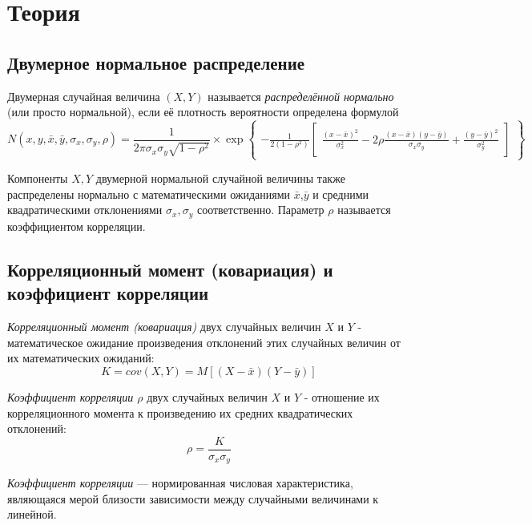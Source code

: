 \documentclass[12pt,a4paper]{article}
\begin{document}
\section{Теория}
\subsection{Двумерное нормальное распределение}
Двумерная случайная величина $(X,Y)$ называется \textit{распределённой нормально} (или просто нормальной), если её плотность вероятности определена формулой
\begin{equation}
    N(x,y,\bar{x},\bar{y},\sigma_x,\sigma_y,\rho)=\frac{1}{2\pi\sigma_x\sigma_y\sqrt{1-\rho^2}}\times\exp{
    \begin{Bmatrix}
        -\frac{1}{2(1-\rho^2)}
        \begin{bmatrix}
            \frac{(x-\bar{x})^2}{\sigma_x^2}-2\rho\frac{(x-\bar{x})(y-\bar{y})}{\sigma_x\sigma_y}+\frac{(y-\bar{y})^2}{\sigma_y^2}
        \end{bmatrix}
    \end{Bmatrix}
    }
\end{equation}

Компоненты $X,Y$ двумерной нормальной случайной величины также распределены нормально с математическими ожиданиями $\bar{x}$,$\bar{y}$ и средними квадратическими отклонениями $\sigma_{x},\sigma_{y}$ соответственно. Параметр $\rho$ называется коэффициентом корреляции.

\subsection{Корреляционный момент (ковариация) и коэффициент корреляции}
\textit{Корреляционный момент (ковариация)} двух случайных величин $X$ и $Y$ - математическое ожидание произведения отклонений этих случайных величин от их математических ожиданий:
\begin{equation}
    K=cov(X,Y)=M[(X-\bar{x})(Y-\bar{y})]
\end{equation}

\textit{Коэффициент корреляции $\rho$} двух случайных величин $X$ и $Y$ - отношение их корреляционного момента к произведению их средних квадратических отклонений:
\begin{equation}
    \rho=\frac{K}{\sigma_x\sigma_y}
\end{equation}

\textit{Коэффициент корреляции} — нормированная числовая характеристика, являющаяся мерой близости зависимости между случайными величинами к линейной.
\end{document}
